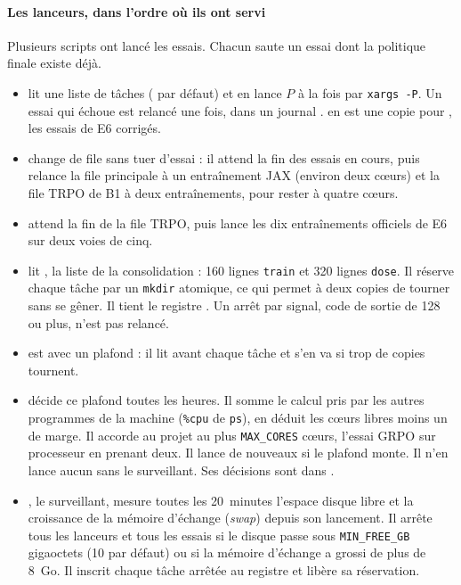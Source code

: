 
\paragraph{Les lanceurs, dans l'ordre où ils ont servi}
Plusieurs scripts ont lancé les essais. Chacun saute un essai dont la politique finale existe déjà.
\begin{itemize}
  \item {} lit une liste de tâches ( par défaut) et en lance $P$ à la fois par
    \texttt{xargs -P}. Un essai qui échoue est relancé une fois, dans un journal .
     en est une copie pour , les essais de E6 corrigés.
  \item {} change de file sans tuer d'essai : il attend la fin des essais en cours, puis
    relance la file principale à un entraînement JAX (environ deux cœurs) et la file TRPO de B1 à deux
    entraînements, pour rester à quatre cœurs.
  \item {} attend la fin de la file TRPO, puis lance les dix entraînements officiels de
    E6 sur deux voies de cinq.
  \item {} lit , la liste de la consolidation : 160 lignes
    \texttt{train} et 320 lignes \texttt{dose}. Il réserve chaque tâche par un \texttt{mkdir} atomique, ce qui
    permet à deux copies de tourner sans se gêner. Il tient le registre . Un arrêt par
    signal, code de sortie de 128 ou plus, n'est pas relancé.
  \item {} est  avec un plafond : il lit  avant chaque tâche
    et s'en va si trop de copies tournent.
  \item {} décide ce plafond toutes les heures. Il somme le calcul pris par les autres
    programmes de la machine (\texttt{\%cpu} de \texttt{ps}), en déduit les cœurs libres moins un de marge. Il
    accorde au projet au plus \texttt{MAX\_CORES} cœurs, l'essai GRPO sur processeur en prenant deux. Il lance
    de nouveaux  si le plafond monte. Il n'en lance aucun sans le surveillant. Ses décisions
    sont dans .
  \item {}, le surveillant, mesure toutes les 20~minutes l'espace disque libre et la
    croissance de la mémoire d'échange (\emph{swap}) depuis son lancement. Il arrête tous les lanceurs et tous
    les essais si le disque passe sous \texttt{MIN\_FREE\_GB} gigaoctets (10 par défaut) ou si la mémoire
    d'échange a grossi de plus de 8~Go. Il inscrit chaque tâche arrêtée au registre et libère sa réservation.
\end{itemize}

